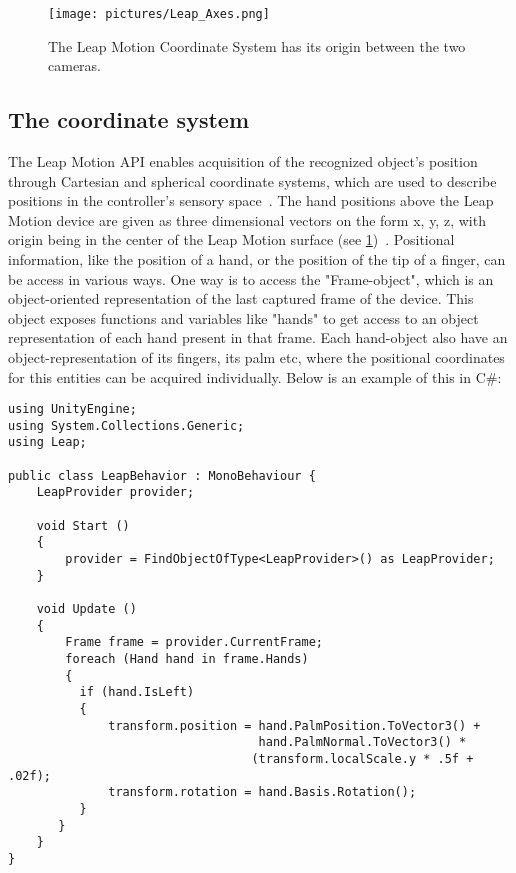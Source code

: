 \begin{figure}%
	\texttt{[image: pictures/Leap\_Axes.png]}
	\caption[Leap Motion Coordinates]{The Leap Motion Coordinate System has its origin between the two cameras.}
	\label{fig:leapmotion3}
\end{figure} 

\subsection{The coordinate system}
The Leap Motion API enables acquisition of the recognized object's position through Cartesian and spherical coordinate systems, 
which are used to describe positions in the controller's sensory space~\citep{Guna2014}. The hand positions above the Leap Motion device are given as three dimensional
vectors on the form {x, y, z}, with origin being in the center of the Leap Motion surface (see \ref{fig:leapmotion3})~\citep{LeapMotion2016}.  
Positional information, like the position of a hand, or the position of the tip of a finger, can be access in various ways. One way is to access the
"Frame-object", which is an object-oriented representation of the last captured frame of the device. This object exposes functions and variables like
"hands" to get access to an object representation of each hand present in that frame. Each hand-object also have an object-representation of its fingers, its palm
etc, where the positional coordinates for this entities can be acquired individually. Below is an example of this in C\#:

\lstset{style=csharp}
\begin{lstlisting}
using UnityEngine;
using System.Collections.Generic;
using Leap;

public class LeapBehavior : MonoBehaviour {
    LeapProvider provider;

    void Start ()
    {
        provider = FindObjectOfType<LeapProvider>() as LeapProvider;
    }

    void Update ()
    {
        Frame frame = provider.CurrentFrame;
        foreach (Hand hand in frame.Hands)
        {
          if (hand.IsLeft)
          {
              transform.position = hand.PalmPosition.ToVector3() +
                                   hand.PalmNormal.ToVector3() *
                                  (transform.localScale.y * .5f + .02f);
              transform.rotation = hand.Basis.Rotation();
          }
       }
    }
}
\end{lstlisting}

